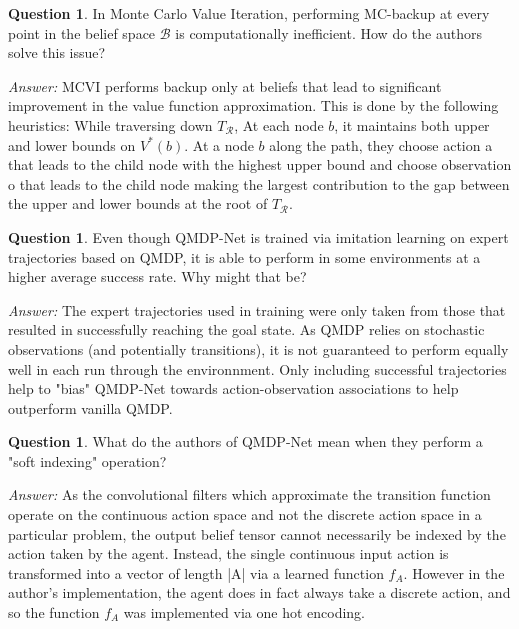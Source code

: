 \documentclass{article}
\theoremstyle{definition}
\newtheorem{question}[thm]{Question}
\newenvironment{answer}{\noindent\textit{Answer:}}{}
\begin{document}
\begin{question}
In Monte Carlo Value Iteration, performing MC-backup at every point in the belief space $\mathcal{B}$ is computationally inefficient. How do the authors solve this issue?
\end{question}

\begin{answer}
MCVI performs backup only at beliefs that lead to significant improvement in the value function approximation. This is done by the following heuristics: While traversing down $T_{\mathcal{R}}$, At each node $b$, it maintains both upper and lower bounds on $V^*(b)$. At a node $b$ along the path, they choose action a that leads to the child node with the highest upper bound and choose observation o that leads to the child node making the largest contribution to the gap between the upper and lower bounds at the root of $T_{\mathcal{R}}$.
\end{answer}

\begin{question}
Even though QMDP-Net is trained via imitation learning on expert trajectories based on QMDP,
it is able to perform in some environments at a higher average success rate. Why might that be?
\end{question}

\begin{answer}
The expert trajectories used in training were only taken from those that resulted in successfully reaching the
goal state. As QMDP relies on stochastic observations (and potentially transitions), it is not guaranteed to perform
equally well in each run through the environnment. Only including successful trajectories help to "bias" QMDP-Net
towards action-observation associations to help outperform vanilla QMDP.
\end{answer}

\begin{question}
What do the authors of QMDP-Net mean when they perform a "soft indexing" operation?
\end{question}

\begin{answer}
As the convolutional filters which approximate the transition function operate on the continuous action space and
not the discrete action space in a particular problem, the output belief tensor cannot necessarily be indexed by
the action taken by the agent. Instead, the single continuous input action is transformed into a vector of length
|A| via a learned function \begin{math} f_A \end{math}. However in the author's implementation, the agent does in fact
always take a discrete action, and so the function \begin{math} f_A \end{math} was implemented via one hot encoding.
\end{answer}
\end{document}

